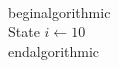 \documentclass[preview]{standalone}
\begin{document}
\begin{center}
\begin{algorithm}
            \\begin{algorithmic}
            \\State $i \gets 10$ 
            \\end{algorithmic}
            \end{algorithm}
\end{center}
\end{document}
